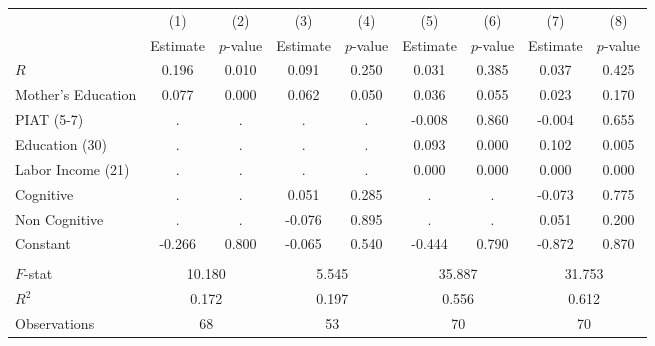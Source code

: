 \begin{tabular}{lcccccccc} \toprule
 & (1) & (2) & (3) & (4) & (5) & (6) & (7) & (8) \\ 
 & Estimate  & $p$-value  & Estimate  & $p$-value  & Estimate  & $p$-value  & Estimate  & $p$-value  \\  \midrule
$R$ &     0.196 &     0.010 &     0.091 &     0.250 &     0.031 &     0.385 &     0.037 &     0.425 \\  
Mother's Education &     0.077 &     0.000 &     0.062 &     0.050 &     0.036 &     0.055 &     0.023 &     0.170 \\  
PIAT (5-7) &         . &         . &         . &         . &    -0.008 &     0.860 &    -0.004 &     0.655 \\  
Education (30) &         . &         . &         . &         . &     0.093 &     0.000 &     0.102 &     0.005 \\  
Labor Income (21) &         . &         . &         . &         . &     0.000 &     0.000 &     0.000 &     0.000 \\  
Cognitive &         . &         . &     0.051 &     0.285 &         . &         . &    -0.073 &     0.775 \\  
Non Cognitive &         . &         . &    -0.076 &     0.895 &         . &         . &     0.051 &     0.200 \\  
Constant &    -0.266 &     0.800 &    -0.065 &     0.540 &    -0.444 &     0.790 &    -0.872 &     0.870 \\  \\ \midrule
$F$-stat &    \multicolumn{2}{c}{10.180} &     \multicolumn{2}{c}{5.545} &          \multicolumn{2}{c}{35.887} &          \multicolumn{2}{c}{31.753} \\  
$R^2$ &     \multicolumn{2}{c}{0.172} &         \multicolumn{2}{c}{0.197} &         \multicolumn{2}{c}{0.556} &           \multicolumn{2}{c}{0.612}  \\  
Observations &    \multicolumn{2}{c}{68} &         \multicolumn{2}{c}{53} &          \multicolumn{2}{c}{70} &          \multicolumn{2}{c}{70} \\  \bottomrule 
\end{tabular}

